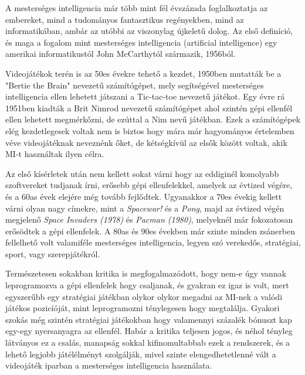
A mesterséges intelligencia már több mint fél évszázada foglalkoztatja az embereket, mind a tudományos fantasztikus regényekben, mind az informatikában, ambár az utóbbi az viszonylag újkeletű dolog. Az első definíció, és maga a fogalom mint mesterséges intelligencia (artificial intelligence) egy amerikai informatikustól John McCarthytól származik, 1956ból{\cite{ai}}.

Videojátékok terén is az 50es évekre tehető a kezdet, 1950ben mutatták be a "Bertie the Brain" nevezetű számítógépet, mely segítségével mesterséges intelligencia ellen lehetett játszani a Tic-tac-toe nevezetű játékot. Egy évre rá 1951ben kiadták a Brit Nimrod nevezetű számítógépet ahol szintén gépi ellenfél ellen lehetett megmérkőzni, de ezúttal a Nim nevű játékban.
Ezek a számítógépek elég kezdetlegesek voltak nem is biztos hogy mára már hagyományos értelemben véve videojátéknak neveznénk őket, de kétségkívül az elsők között voltak, akik MI-t használtak ilyen célra.

Az első kísérletek után nem kellett sokat várni hogy az eddiginél komolyabb szoftvereket tudjanak írni, erősebb gépi ellenfelekkel, amelyek az évtized végére, és a 60as évek elejére még tovább fejlődtek. Ugyanakkor a 70es évekig kellett várni olyan nagy címekre, mint a \textit{Spacewar!} és a \textit{Pong}, majd az évtized végén megjelenő \textit{ Space Invaders (1978)} és \textit{Pacman (1980)}, melyeknél már fokozatosan erősödtek a gépi ellenfelek.
A 80as és 90es években már szinte minden zsánerben fellelhető volt valamiféle mesterséges intelligencia, legyen szó verekedős, stratégiai, sport, vagy szerepjátékról.

Természetesen sokakban kritika is megfogalmazódott, hogy nem-e úgy vannak leprogramozva a gépi ellenfelek hogy csaljanak, és gyakran ez igaz is volt, mert egyszerűbb egy stratégiai játékban olykor olykor megadni az MI-nek a valódi játékos pozicíóját, mint leprogramozni ténylegesen hogy megtalálja. Gyakori szokás még szintén stratégiai játékokban hogy valamennyi százalék bónuszt kap egy-egy nyersanyagra az ellenfél. Habár a kritika teljesen jogos, és néhol tényleg látványos ez a csalás, manapság sokkal kifinomultabbab ezek a rendszerek, és a lehető legjobb játélélményt szolgálják, mivel szinte elengedhetetlenné vált a videojáték iparban a mesterséges intelligencia használata.

